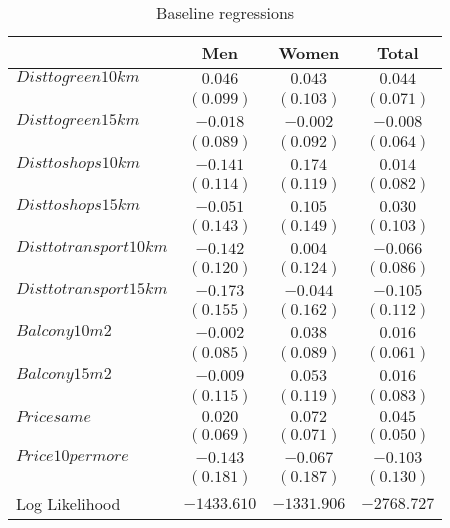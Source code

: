 
\begin{table}[H]
\caption{Baseline regressions\label{tab:reg}}
\begin{center}
\begin{tabular}{l c c c}
\hline
 & Men & Women & Total \\
\hline
$Dist to green 10km$     & $0.046$     & $0.043$     & $0.044$     \\
                         & $(0.099)$   & $(0.103)$   & $(0.071)$   \\
$Dist to green 15km$     & $-0.018$    & $-0.002$    & $-0.008$    \\
                         & $(0.089)$   & $(0.092)$   & $(0.064)$   \\
$Dist to shops 10km$     & $-0.141$    & $0.174$     & $0.014$     \\
                         & $(0.114)$   & $(0.119)$   & $(0.082)$   \\
$Dist to shops 15km$     & $-0.051$    & $0.105$     & $0.030$     \\
                         & $(0.143)$   & $(0.149)$   & $(0.103)$   \\
$Dist to transport 10km$ & $-0.142$    & $0.004$     & $-0.066$    \\
                         & $(0.120)$   & $(0.124)$   & $(0.086)$   \\
$Dist to transport 15km$ & $-0.173$    & $-0.044$    & $-0.105$    \\
                         & $(0.155)$   & $(0.162)$   & $(0.112)$   \\
$Balcony 10m2$           & $-0.002$    & $0.038$     & $0.016$     \\
                         & $(0.085)$   & $(0.089)$   & $(0.061)$   \\
$Balcony 15m2$           & $-0.009$    & $0.053$     & $0.016$     \\
                         & $(0.115)$   & $(0.119)$   & $(0.083)$   \\
$Price same$             & $0.020$     & $0.072$     & $0.045$     \\
                         & $(0.069)$   & $(0.071)$   & $(0.050)$   \\
$Price 10per more$       & $-0.143$    & $-0.067$    & $-0.103$    \\
                         & $(0.181)$   & $(0.187)$   & $(0.130)$   \\
\hline
Log Likelihood           & $-1433.610$ & $-1331.906$ & $-2768.727$ \\

\end{tabular}
\end{center}
\end{table}
